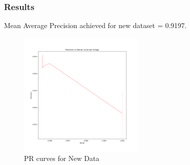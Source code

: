 \documentclass[11pt]{beamer}
\begin{document}
\begin{frame}
	\frametitle{Results}
Mean Average Precision achieved for new dataset = 0.9197. 
	\begin{figure}
	\includegraphics[height=6cm]{all.png}
	\caption{PR curves for New Data}
\end{figure}
\end{frame}
\end{document}
